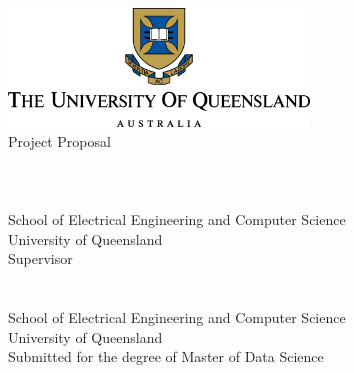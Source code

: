 \begin{titlepage}
	\begin{center}
	   \includegraphics[width=0.6\textwidth]{UQLogo.png}\\
        \vfill
	   \Large {Project Proposal}\\
          \huge \covertext
        \vfill
	   \Large \authortext \\
            \large \studentnotext \\
            \large {} \\
	   \large School of Electrical Engineering and Computer Science\\\smallskip
            \large University of Queensland\\
        \vfill
            \large Supervisor \\
            \large \textbf{\supervisornametext} \\
            \large {} \\
            \large School of Electrical Engineering and Computer Science \\
            \large University of Queensland\\
        \vfill
            \large {Submitted for the degree of Master of Data Science} \\
	   \large \proposalduedate
	\end{center}
\end{titlepage}

\thispagestyle{empty} %
\newpage